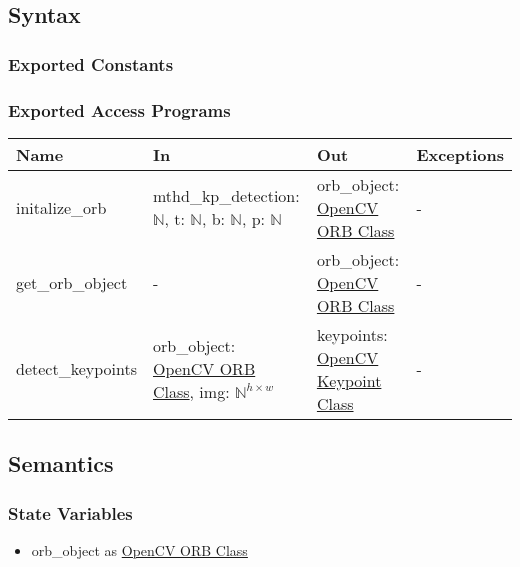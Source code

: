 \documentclass[12pt, titlepage]{article}
\begin{document}
\subsection{Syntax}

\subsubsection{Exported Constants}

\subsubsection{Exported Access Programs}

\begin{center}
\begin{tabular}{p{4cm} p{4.5cm} p{4cm} p{2cm}}
\hline
\textbf{Name} & \textbf{In} & \textbf{Out} & \textbf{Exceptions} \\
\hline
initalize\_orb 
& mthd\_kp\_detection: $\mathbb{N}$,\newline
t: $\mathbb{N}$, \newline
b: $\mathbb{N}$, \newline
p: $\mathbb{N}$
& orb\_object: \href{https://docs.opencv.org/3.4/db/d95/classcv_1_1ORB.html}{OpenCV ORB Class}
& - \\
\hline
get\_orb\_object 
& -
& orb\_object: \href{https://docs.opencv.org/3.4/db/d95/classcv_1_1ORB.html}{OpenCV ORB Class}
& - \\
\hline
detect\_keypoints 
& orb\_object: \href{https://docs.opencv.org/3.4/db/d95/classcv_1_1ORB.html}{OpenCV ORB Class}, \newline
img: $\mathbb{N}^{h \times w}$
& keypoints: \href{https://docs.opencv.org/3.4/d2/d29/classcv_1_1KeyPoint.html}{OpenCV Keypoint Class}
& - \\
\hline
\end{tabular}
\end{center}

\subsection{Semantics}

\subsubsection{State Variables}
\begin{itemize}
  \item orb\_object as \href{https://docs.opencv.org/3.4/db/d95/classcv_1_1ORB.html}{OpenCV ORB Class}
\end{itemize}
\end{document}
